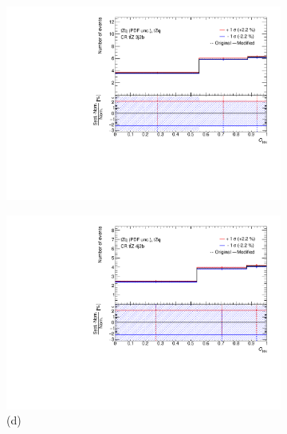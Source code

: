 \begin{figure}[!h]
\begin{subfigure}[b]{0.33\linewidth}
    \centering
    \includegraphics[width=\textwidth]{ubonn-thesis/Chapters/Chapters_07/Figure/Data/Systematic/tZq_pdf/CR_3j2b_tZq_tZq_XS_PDFunc.pdf} 
    \caption{}
  \end{subfigure}%
  \newline
  \begin{subfigure}[b]{0.33\linewidth}
  \centering
    \includegraphics[width=\textwidth]{ubonn-thesis/Chapters/Chapters_07/Figure/Data/Systematic/tZq_pdf/CR_4j2b_tZq_tZq_XS_PDFunc.pdf} 
    \caption*{(d)}
  \end{subfigure} 
  \begin{subfigure}[b]{0.33\linewidth}
  \centering

\end{subfigure}
\end{figure}
